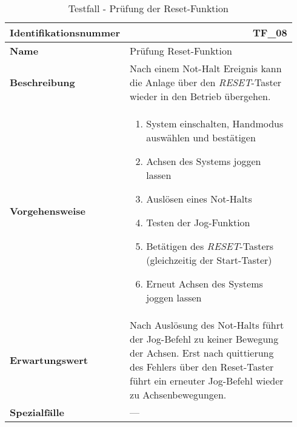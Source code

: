 \documentclass[../../../Bachelorarbeit.tex]{subfiles}
\begin{document}
\begin{table}[H]
    \centering
    \begin{tabular}{ p{0.34\linewidth}  p{0.6\linewidth} }
        \hline
        \textbf{Identifikationsnummer}  & \multicolumn{1}{r}{TF\_08} \\ \hline
        \textbf{Name}                   & Prüfung Reset-Funktion \\
        \textbf{Beschreibung}           & Nach einem Not-Halt Ereignis kann die Anlage über den \textit{RESET}-Taster wieder in den Betrieb übergehen. \\
        \textbf{Vorgehensweise}         &   {\begin{enumerate}[noitemsep,topsep=0pt,parsep=0pt,partopsep=0pt,leftmargin=*]
                                                \item System einschalten, Handmodus auswählen und bestätigen
                                                \item Achsen des Systems joggen lassen
                                                \item Auslösen eines Not-Halts
                                                \item Testen der Jog-Funktion
                                                \item Betätigen des \textit{RESET}-Tasters (gleichzeitig der Start-Taster)
                                                \item Erneut Achsen des Systems joggen lassen
                                            \end{enumerate}} \\
        \textbf{Erwartungswert}         & Nach Auslösung des Not-Halts führt der Jog-Befehl zu keiner Bewegung der Achsen. Erst nach quittierung des Fehlers über den Reset-Taster führt ein erneuter Jog-Befehl wieder zu Achsenbewegungen. \\
        \textbf{Spezialfälle}           & --- \\ \hline
    \end{tabular}
    \caption[\acs{tf} - Reset-Funktion]{Testfall - Prüfung der Reset-Funktion}
    \label{tab:my-table68}
\end{table}
\end{document}
